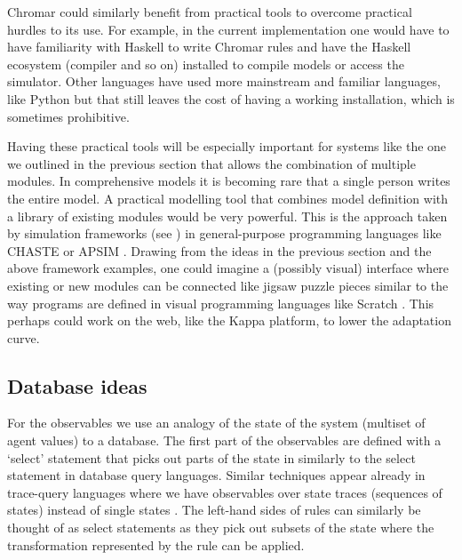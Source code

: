Chromar could similarly benefit from practical tools to overcome practical
hurdles to its use. For example, in the current implementation one would have to
have familiarity with Haskell to write Chromar rules and have the Haskell
ecosystem (compiler and so on) installed to compile models or access the
simulator. Other languages have used more mainstream and familiar languages,
like Python \citep[Kappa or L-systems in Python;][]{lopez_programming_2013,
  boudon2012py} but that still leaves the cost of having a working installation,
which is sometimes prohibitive.

Having these practical tools will be especially important for systems like the
one we outlined in the previous section that allows the combination of multiple
modules. In comprehensive models it is becoming rare that a single person writes
the entire model. A practical modelling tool that combines model definition with
a library of existing modules would be very powerful. This is the approach taken
by simulation frameworks (see ) in general-purpose
programming languages like CHASTE \citep[suite of software for heart
simulation][]{mirams2013chaste} or APSIM \citep[crop
modelling][]{keating_overview_2003}. Drawing from the ideas in the previous
section and the above framework examples, one could imagine a (possibly visual)
interface where existing or new modules can be connected like jigsaw puzzle
pieces similar to the way programs are defined in visual programming languages
like Scratch \citep{maloney_scratch_2010}. This perhaps could work on the web,
like the Kappa platform, to lower the adaptation curve.

\subsection{Database ideas}
For the observables we use an analogy of the state of the system (multiset of
agent values) to a database. The first part of the observables are defined with
a `select' statement that picks out parts of the state in similarly to the
select statement in database query languages. Similar techniques appear already
in trace-query languages where we have observables over state traces (sequences
of states) instead of single states \citep{laurent_trace_2018}. The left-hand
sides of rules can similarly be thought of as select statements as they pick out
subsets of the state where the transformation represented by the rule can be
applied.


